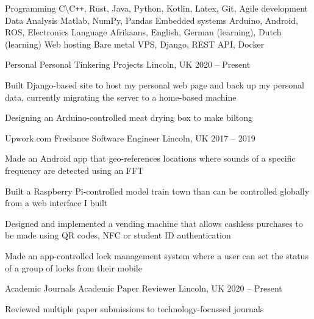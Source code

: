 \documentclass[11pt,a4paper]{awesome-cv}        %
\begin{document}
\newpage
{}

\begin{cvskills}
  \cvskill
  {Programming}%
  {C\textbackslash C\texttt{++}, Rust, Java, Python, Kotlin, Latex, Git, Agile development}%
  \cvskill
  {Data Analysis}%
  {Matlab, NumPy, Pandas}%
  \cvskill
  {Embedded systems}
  {Arduino, Android, ROS, Electronics}
  \cvskill
  {Language}
  {Afrikaans, English, German (learning), Dutch (learning)}
  \cvskill
  {Web hosting}
  {Bare metal VPS, Django, REST API, Docker}
\end{cvskills}



\begin{cventries}

  \cventry
  {Personal}
  {Personal Tinkering Projects}
  {Lincoln, UK}
  {2020 -- Present}
  {
    \begin{cvitems}
      \item Built Django-based site to host my personal web page and back up my personal data, currently migrating the server to a home-based machine
      \item Designing an Arduino-controlled meat drying box to make biltong
    \end{cvitems}
  }
  \cventry
  {Upwork.com}
  {Freelance Software Engineer}
  {Lincoln, UK}
  {2017 -- 2019}
  {
    \begin{cvitems}
      \item Made an Android app that geo-references locations where sounds of a specific frequency are detected using an FFT
      \item Built a Raspberry Pi-controlled model train town than can be controlled globally from a web interface I built
      \item Designed and implemented a vending machine that allows cashless purchases to be made using QR codes, NFC or student ID authentication 
      \item Made an app-controlled lock management system where a user can set the status of a group of locks from their mobile
    \end{cvitems}
  }
  \cventry
  {Academic Journals}
  {Academic Paper Reviewer}
  {Lincoln, UK}
  {2020 -- Present}
  {
    \begin{cvitems}
    \item Reviewed multiple paper submissions to technology-focussed journals
    \end{cvitems}
  }
\end{cventries}
\end{document}
